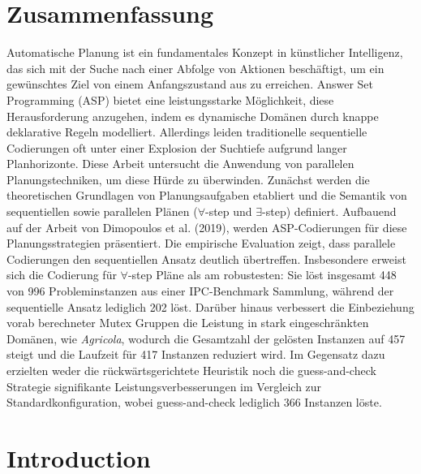 \documentclass[
     11pt,                    %
     a4paper,             %
     BCOR=10mm,     %
     DIV=14,                 %
     listof=totoc,                    %
     bibliography=totoc,       %
     index=totoc,              %
     parskip            %
     twoside,
     headsepline
     ]{scrreprt}
\theoremstyle{definition}
\theoremstyle{definition}
\theoremstyle{remark}
\theoremstyle{bfnote}
\begin{document}
\chapter*{Zusammenfassung}
Automatische Planung ist ein fundamentales Konzept in künstlicher Intelligenz, das sich mit der Suche nach einer Abfolge von Aktionen beschäftigt, um ein gewünschtes Ziel von einem Anfangszustand aus zu erreichen. Answer Set Programming (ASP) bietet eine leistungsstarke Möglichkeit, diese Herausforderung anzugehen, indem es dynamische Domänen durch knappe deklarative Regeln modelliert.
Allerdings leiden traditionelle sequentielle Codierungen oft unter einer Explosion der Suchtiefe aufgrund langer Planhorizonte. Diese Arbeit untersucht die Anwendung von parallelen Planungstechniken, um diese Hürde zu überwinden. Zunächst werden die theoretischen Grundlagen von Planungsaufgaben etabliert und die Semantik von sequentiellen sowie parallelen Plänen ($\forall$-step und $\exists$-step) definiert. Aufbauend auf der Arbeit von Dimopoulos et al. (2019), werden ASP-Codierungen für diese Planungsstrategien präsentiert.  
Die empirische Evaluation zeigt, dass parallele Codierungen den sequentiellen Ansatz deutlich übertreffen. Insbesondere erweist sich die Codierung für $\forall$-step Pläne als am robustesten: Sie löst insgesamt 448 von 996 Probleminstanzen aus einer IPC-Benchmark Sammlung, während der sequentielle Ansatz lediglich 202 löst. Darüber hinaus verbessert die Einbeziehung vorab berechneter Mutex Gruppen die Leistung in stark eingeschränkten Domänen, wie \textit{Agricola}, wodurch die Gesamtzahl der gelösten Instanzen auf 457 steigt und die Laufzeit für 417 Instanzen reduziert wird. Im Gegensatz dazu erzielten weder die rückwärtsgerichtete Heuristik noch die guess-and-check Strategie signifikante Leistungsverbesserungen im Vergleich zur Standardkonfiguration, wobei guess-and-check lediglich 366 Instanzen löste.  



\tableofcontents
\cleardoublepage
{} 

\listoffigures
\listoflistings
\cleardoublepage


\chapter{Introduction}\label{intro}
\end{document}
